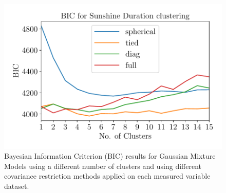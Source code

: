 \documentclass[a4paper,fleqn,usenatbib]{mnras}
\begin{document}
\begin{figure}
\begin{center}
\includegraphics[scale=0.5]{bicb.pdf}
\caption{Bayesian Information Criterion (BIC) results for Gaussian Mixture Models using a different number of clusters and using different covariance restriction methods \citep{sklearn} applied on each measured variable dataset.}\label{bic}
\end{center}
\end{figure}
\end{document}

